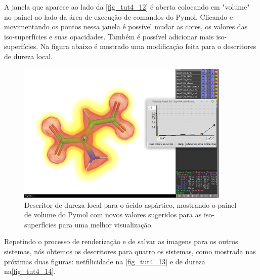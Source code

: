 \documentclass[a4paper,11pt]{refart}
\begin{document}
A janela que aparece ao lado da \autoref{fig_tut4_12} é aberta colocando em "volume" no painel ao lado da área de execução de comandos do Pymol. Clicando e movimentando os pontos nessa janela é possível mudar as cores, os valores das iso-superfícies e suas opacidades. Também é possível adicionar mais iso-superfícies. Na figura abaixo é mostrado uma modificação feita para o descritores de dureza local. 


\hspace*{-\leftmarginwidth}
\begin{minipage}{\fullwidth}
	\begin{figure}[H]
		\begin{center}
			\includegraphics[width=4in]{images/tut4_img14}
			\caption{Descritor de dureza local para o ácido aspártico, mostrando o painel de volume do Pymol com novos valores sugeridos para as iso-superfícies para uma melhor visualização.}
			\label{fig_tut4_12}
		\end{center}
	\end{figure}
\end{minipage}

Repetindo o processo de renderização e de salvar as imagens para os outros sistemas, nós obtemos os descritores para quatro os sistemas, como mostrada nas próximas duas figuras: netfilicidade na \autoref{fig_tut4_13} e de dureza na\autoref{fig_tut4_14}.
\end{document}
